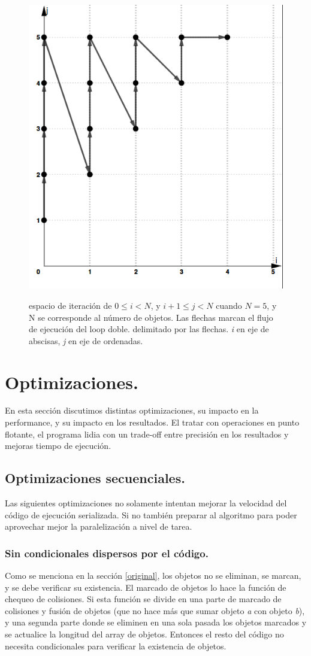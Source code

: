 \documentclass{article}
\begin{document}
\begin{figure}[h!]
	\centering
	\includegraphics[width=0.5\linewidth,height=0.5\textwidth]{resources/loop_anidado_no_tiling_505x565.png}
	\label{fig:no_tiling}
	\caption{espacio de iteración de $0\leq{i} < {N}$, y $i+1\leq{j} < {N}$
		cuando ${N}=5$, y N se corresponde al número de objetos. Las flechas marcan el flujo de ejecución del loop doble.
		delimitado por las flechas. \textit{i} en eje de abscisas, \textit{j} en eje de ordenadas.}
\end{figure}

\section{Optimizaciones.\label{opt}}

En esta sección discutimos distintas optimizaciones, su impacto en la performance,
y su impacto en los resultados. El tratar con operaciones en punto flotante, el programa
lidia con un trade-off entre precisión en los resultados y mejoras tiempo de ejecución.

\subsection{Optimizaciones secuenciales.\label{opt_seq}}
Las siguientes optimizaciones no solamente intentan mejorar la velocidad
del código de ejecución serializada. Si no también preparar al algoritmo
para poder aprovechar mejor la paralelización a nivel de tarea.

\subsubsection{Sin condicionales dispersos por el código.\label{no_if}}

Como se menciona en
la sección \ref{original}, los objetos no se eliminan, se marcan, y se debe verificar su existencia.
El marcado de objetos lo hace la función de chequeo de colisiones. Si esta función se divide en una parte de marcado
de colisiones y fusión de objetos (que no hace más que sumar objeto \textit{a} con objeto \textit{b}), y
una segunda parte donde se eliminen en una sola pasada los objetos marcados y se actualice la longitud
del array de objetos. Entonces el resto del código no necesita condicionales para verificar la existencia de objetos.
\end{document}
